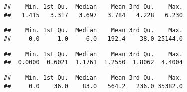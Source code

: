 \documentclass[
]{article}
\newenvironment{Shaded}{\begin{snugshade}}{\end{snugshade}}
\newcommand{\ConstantTok}[1]{\textcolor[rgb]{0.56,0.35,0.01}{#1}}
\newcommand{\FunctionTok}[1]{\textcolor[rgb]{0.13,0.29,0.53}{\textbf{#1}}}
\newcommand{\NormalTok}[1]{#1}
\newcommand{\SpecialCharTok}[1]{\textcolor[rgb]{0.81,0.36,0.00}{\textbf{#1}}}
\begin{document}
\begin{Shaded}
\end{Shaded}

\begin{verbatim}
##    Min. 1st Qu.  Median    Mean 3rd Qu.    Max. 
##   1.415   3.317   3.697   3.784   4.228   6.230
\end{verbatim}

\begin{Shaded}
\end{Shaded}

\begin{verbatim}
##    Min. 1st Qu.  Median    Mean 3rd Qu.    Max. 
##     0.0     1.0     6.0   192.4    38.0 25144.0
\end{verbatim}

\begin{Shaded}
\end{Shaded}

\begin{verbatim}
##    Min. 1st Qu.  Median    Mean 3rd Qu.    Max. 
##  0.0000  0.6021  1.1761  1.2550  1.8062  4.4004
\end{verbatim}

\begin{Shaded}
\end{Shaded}

\begin{verbatim}
##    Min. 1st Qu.  Median    Mean 3rd Qu.    Max. 
##     0.0    36.0    83.0   564.2   236.0 35382.0
\end{verbatim}
\end{document}
